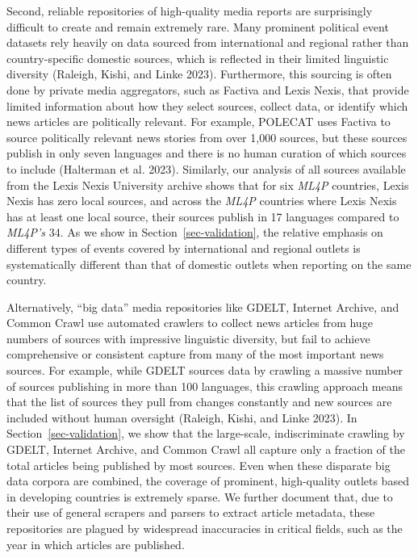 \documentclass[
  letterpaper,
  DIV=11,
  numbers=noendperiod]{scrartcl}
\begin{document}
Second, reliable repositories of high-quality media reports are
surprisingly difficult to create and remain extremely rare. Many
prominent political event datasets rely heavily on data sourced from
international and regional rather than country-specific domestic
sources, which is reflected in their limited linguistic diversity
(Raleigh, Kishi, and Linke 2023). Furthermore, this sourcing is often
done by private media aggregators, such as Factiva and Lexis Nexis, that
provide limited information about how they select sources, collect data,
or identify which news articles are politically relevant. For example,
POLECAT uses Factiva to source politically relevant news stories from
over 1,000 sources, but these sources publish in only seven languages
and there is no human curation of which sources to include (Halterman et
al. 2023). Similarly, our analysis of all sources available from the
Lexis Nexis University archive shows that for six \emph{ML4P} countries,
Lexis Nexis has zero local sources, and across the \emph{ML4P} countries
where Lexis Nexis has at least one local source, their sources publish
in 17 languages compared to \emph{ML4P's} 34. As we show in
Section~\ref{sec-validation}, the relative emphasis on different types
of events covered by international and regional outlets is
systematically different than that of domestic outlets when reporting on
the same country.

Alternatively, ``big data'' media repositories like GDELT, Internet
Archive, and Common Crawl use automated crawlers to collect news
articles from huge numbers of sources with impressive linguistic
diversity, but fail to achieve comprehensive or consistent capture from
many of the most important news sources. For example, while GDELT
sources data by crawling a massive number of sources publishing in more
than 100 languages, this crawling approach means that the list of
sources they pull from changes constantly and new sources are included
without human oversight (Raleigh, Kishi, and Linke 2023). In
Section~\ref{sec-validation}, we show that the large-scale,
indiscriminate crawling by GDELT, Internet Archive, and Common Crawl all
capture only a fraction of the total articles being published by most
sources. Even when these disparate big data corpora are combined, the
coverage of prominent, high-quality outlets based in developing
countries is extremely sparse. We further document that, due to their
use of general scrapers and parsers to extract article metadata, these
repositories are plagued by widespread inaccuracies in critical fields,
such as the year in which articles are published.
\end{document}
